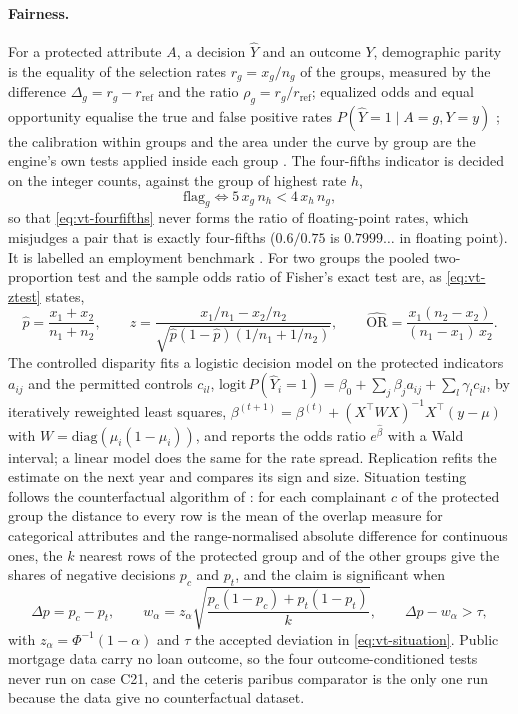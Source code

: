 \paragraph{Fairness.} For a protected attribute $A$, a decision $\hat Y$ and an outcome $Y$, demographic parity is the equality of the selection rates $r_g=x_g/n_g$ of the groups, measured by the difference $\Delta_g=r_g-r_{\mathrm{ref}}$ and the
ratio $\rho_g=r_g/r_{\mathrm{ref}}$; equalized odds and equal opportunity equalise the true and false positive rates $P(\hat Y=1\mid A=g,Y=y)$ \citep{validation-tests:hardt2016}; the calibration within groups and the area under the curve by group are the engine's
own tests applied inside each group \citep{validation-tests:kozodoi2022,credit-scoring:naeini2015}. The four-fifths indicator is decided on the integer counts, against the group of highest rate $h$,
\begin{equation}
  \text{flag}_g\iff 5\,x_g\,n_h<4\,x_h\,n_g,
  \label{eq:vt-fourfifths}
\end{equation}
so that \cref{eq:vt-fourfifths} never forms the ratio of floating-point rates, which misjudges a pair that is exactly four-fifths ($0.6/0.75$ is $0.7999\ldots$ in floating point). It is labelled an employment benchmark \citep{validation-tests:cfr1607}. For two groups the pooled two-proportion test and the sample odds ratio of Fisher's exact test are, as \cref{eq:vt-ztest} states,
\begin{equation}
  \hat p=\frac{x_1+x_2}{n_1+n_2},\qquad z=\frac{x_1/n_1-x_2/n_2}{\sqrt{\hat p(1-\hat p)(1/n_1+1/n_2)}},\qquad \widehat{\mathrm{OR}}=\frac{x_1(n_2-x_2)}{(n_1-x_1)\,x_2}.
  \label{eq:vt-ztest}
\end{equation}
The controlled disparity fits a logistic decision model on the protected indicators $a_{ij}$ and the permitted controls $c_{il}$,
$\mathrm{logit}\,P(\hat Y_i=1)=\beta_0+\sum_j\beta_ja_{ij}+\sum_l\gamma_lc_{il}$, by iteratively reweighted least squares, $\beta^{(t+1)}=\beta^{(t)}+(X^{\top}WX)^{-1}X^{\top}(y-\mu)$ with $W=\mathrm{diag}(\mu_i(1-\mu_i))$, and reports the odds ratio $e^{\hat\beta}$ with a
Wald interval; a linear model does the same for the rate spread. Replication refits the estimate on the next year and compares its sign and size. Situation testing follows the counterfactual algorithm of
\citet{validation-tests:alvarez2025}: for each complainant $c$ of the protected group the distance to every row is the mean of the overlap measure for categorical attributes and the range-normalised absolute difference for continuous ones,
the $k$ nearest rows of the protected group and of the other groups give the shares of negative decisions $p_c$ and $p_t$, and the claim is significant when
\begin{equation}
  \Delta p=p_c-p_t,\qquad w_\alpha=z_\alpha\sqrt{\frac{p_c(1-p_c)+p_t(1-p_t)}{k}},\qquad \Delta p-w_\alpha>\tau,
  \label{eq:vt-situation}
\end{equation}
with $z_\alpha=\Phi^{-1}(1-\alpha)$ and $\tau$ the accepted deviation in \cref{eq:vt-situation}. Public mortgage data carry no loan outcome, so the four outcome-conditioned tests never run on case C21, and the ceteris paribus comparator is the only one run because the data give
no counterfactual dataset.

